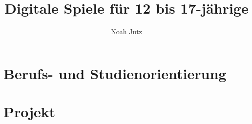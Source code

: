 \documentclass[12pt]{article}
\title{Digitale Spiele für 12 bis 17-jährige}
\author{Noah Jutz}
\date{}
\begin{document}
    \maketitle
    \newpage
    \tableofcontents

    \newpage
    \section{Berufs- und Studienorientierung}
    \section{Projekt}
\end{document}
